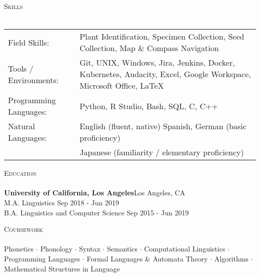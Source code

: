 \documentclass[]{article}
\newcommand{\lineunder} {
	\vspace*{-8pt} \\
	\hspace*{-18pt} \hrulefill \\
}
\newcommand{\header} [1] {
	{\hspace*{-18pt}\vspace*{6pt} \textsc{#1}}
	\vspace*{-6pt} \lineunder
}
\begin{document}
	\header{Skills}
	\begin{tabular}{ l p{11.2cm} }
		Field Skills:          & Plant Identification, Specimen Collection, Seed Collection, Map \& Compass Navigation \\
		
		Tools / Environments:  & Git, UNIX, Windows, Jira, Jenkins, Docker, Kubernetes, Audacity, Excel, Google Workspace, Microsoft Office, \LaTeX
		\\
		Programming Languages: & Python, R Studio, Bash, SQL, C, C++
		\\
		Natural Languages:     & English \hfill (fluent, native) \newline Spanish, German \hfill (basic proficiency)
		\\
		\newline & Japanese \hfill (familiarity / elementary proficiency)
		\\
	\end{tabular}
	\vspace{2mm}
	
	
	\header{Education}
	\textbf{University of California, Los Angeles}\hfill Los Angeles, CA\\
	M.A. Linguistics \hfill Sep 2018 - Jun 2019\\
	\vspace{1mm}
	B.A. Linguistics and Computer Science \hfill Sep 2015 - Jun 2019\\
	\vspace{1mm}
	\vspace{1mm}
	
	\header{Coursework}
	Phonetics $\cdot$ Phonology $\cdot$ Syntax $\cdot$ Semantics $\cdot$ Computational Linguistics $\cdot$ Programming Languages $\cdot$ Formal Languages \& Automata Theory $\cdot$ Algorithms $\cdot$ Mathematical Structures in Language
	\vspace*{10mm}
	
\end{document}
